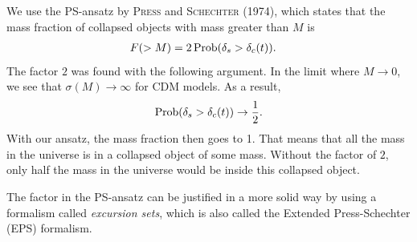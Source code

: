 We use the PS-ansatz by \textsc{Press} and \textsc{Schechter} (1974), which states that the mass fraction of collapsed objects with mass greater than $M$ is
\begin{align*}
	F(>M)
	&= 2 \operatorname{Prob}(\delta_s > \delta_c(t)).
\end{align*}
The factor $2$ was found with the following argument.
In the limit where $M \to 0$, we see that $\sigma(M) \to \infty$ for CDM models.
As a result,
\begin{align*}
	\operatorname{Prob}(\delta_s > \delta_c(t)) \to \frac{1}{2}.
\end{align*}
With our ansatz, the mass fraction then goes to 1.
That means that all the mass in the universe is in a collapsed object of some mass.
Without the factor of $2$, only half the mass in the universe would be inside this collapsed object.

The factor in the PS-ansatz can be justified in a more solid way by using a formalism called \emph{excursion sets}, which is also called the Extended Press-Schechter (EPS) formalism.


